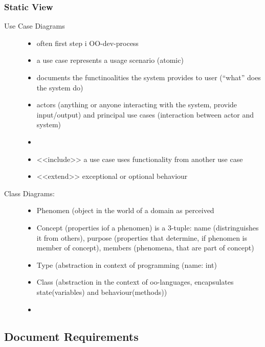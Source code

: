 \documentclass[a4paper, 10pt]{article}
\begin{document}
\subsubsection{Static View}
\begin{description}
	\item[Use Case Diagrams]
	\begin{itemize}
		\item often first step i OO-dev-process
		\item a use case represents a usage scenario (atomic)
		\item documents the functinoalities the system provides to user (``what'' does the system do)
		\item actors (anything or anyone interacting with the system, provide input/output) and principal use cases (interaction between actor and system)
		\item 
		\item <<include>> \follows a use case uses functionality from another use case
		\item <<extend>> \follows exceptional or optional behaviour
	\end{itemize}
	\item[Class Diagrams:]
	\begin{itemize}
		\item Phenomen (object in the world of a domain as perceived
		\item Concept (properties iof a phenomen) is a 3-tuple: name (distringuishes it from others), purpose (properties that determine, if phenomen is member of concept), members (phenomena, that are part of concept)
		\item Type (abstraction in context of programming (name: int)
		\item Class (abstraction in the context of oo-languages, encapsulates state(variables) and behaviour(methods))
		\item 
	\end{itemize}
\end{description}

\subsection*{Document Requirements}
\end{document}

